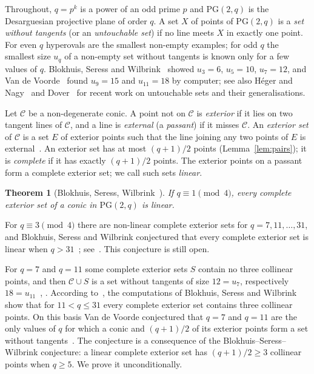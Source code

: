 \documentclass[11pt]{amsart}
\newtheorem{theorem}{Theorem}[section]
\theoremstyle{definition}
\theoremstyle{remark}
\numberwithin{equation}{section}
\newcommand{\PGtwo}{\mathrm{PG}(2,q)}
\newcommand{\Con}{\mathcal{C}}
\begin{document}
Throughout, $q=p^k$ is a power of an odd prime $p$ and $\PGtwo$ is the Desarguesian projective plane of order $q$. A set
$X$ of points of $\PGtwo$ is a \emph{set without tangents} (or an \emph{untouchable set}) if no line meets $X$ in exactly one
point. For even $q$ hyperovals are the smallest non-empty examples; for odd $q$ the smallest size $u_q$ of a non-empty set
without tangents is known only for a few values of $q$. Blokhuis, Seress and Wilbrink~\cite{BSW91} showed $u_3=6$, $u_5=10$,
$u_7=12$, and Van de Voorde~\cite[\S1.2]{VdV} found $u_9=15$ and $u_{11}=18$ by computer; see also Héger and
Nagy~\cite{HegerNagy} and Dover~\cite{Dover} for recent work on untouchable sets and their generalisations.

Let $\Con$ be a non-degenerate conic. A point not on $\Con$ is \emph{exterior} if it lies on two tangent lines of $\Con$, and a
line is \emph{external} (a \emph{passant}) if it misses $\Con$. An \emph{exterior set} of $\Con$ is a set $E$ of exterior points
such that the line joining any two points of $E$ is external~\cite[\S1.1]{VdV}. An exterior set has at most $(q+1)/2$ points
(Lemma~\ref{lem:pairs}); it is \emph{complete} if it has exactly $(q+1)/2$ points. The exterior points on a passant form a
complete exterior set; we call such sets \emph{linear}.

\begin{theorem}[Blokhuis, Seress, Wilbrink~\cite{BSW92}]\label{thm:BSW}
If $q\equiv1\pmod4$, every complete exterior set of a conic in $\PGtwo$ is linear.
\end{theorem}

For $q\equiv3\pmod4$ there are non-linear complete exterior sets for $q=7,11,\dots,31$, and Blokhuis, Seress and Wilbrink
conjectured that every complete exterior set is linear when $q>31$~\cite{BSW92}; see~\cite[\S1.1, \S3]{VdV}. This conjecture
is still open.

For $q=7$ and $q=11$ some complete exterior sets $S$ contain no three collinear points, and then $\Con\cup S$ is a set without
tangents of size $12=u_7$, respectively $18=u_{11}$~\cite[\S3]{VdV}, \cite{HegerNagy}. According to~\cite[\S3]{VdV}, the
computations of Blokhuis, Seress and Wilbrink show that for $11<q\le31$ every complete exterior set contains three collinear
points. On this basis Van de Voorde conjectured that $q=7$ and $q=11$ are the only values of $q$ for which a conic and $(q+1)/2$
of its exterior points form a set without tangents~\cite[\S3]{VdV}. The conjecture is a consequence of the
Blokhuis--Seress--Wilbrink conjecture: a linear complete exterior set has $(q+1)/2\ge3$ collinear points when $q\ge5$. We prove
it unconditionally.
\end{document}
